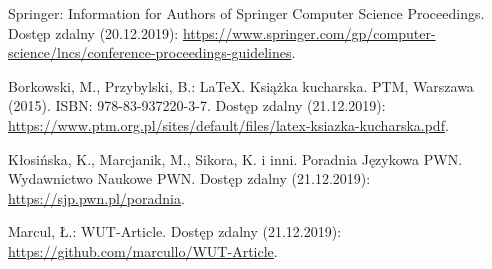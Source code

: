 \begin{thebibliography}{9} %
Springer: Information for Authors of Springer Computer Science Proceedings. Dostęp zdalny (20.12.2019):
\url{https://www.springer.com/gp/computer-science/lncs/conference-proceedings-guidelines}.

Borkowski, M., Przybylski, B.: \LaTeX. Książka kucharska. PTM, Warszawa (2015). ISBN: 978-83-937220-3-7. Dostęp zdalny (21.12.2019):
\url{https://www.ptm.org.pl/sites/default/files/latex-ksiazka-kucharska.pdf}.

Kłosińska, K., Marcjanik, M., Sikora, K. i inni. Poradnia Językowa PWN. Wydawnictwo Naukowe PWN. Dostęp zdalny (21.12.2019):
\url{https://sjp.pwn.pl/poradnia}.

Marcul, Ł.: WUT-Article. Dostęp zdalny (21.12.2019):\\
\url{https://github.com/marcullo/WUT-Article}.
\end{thebibliography}
